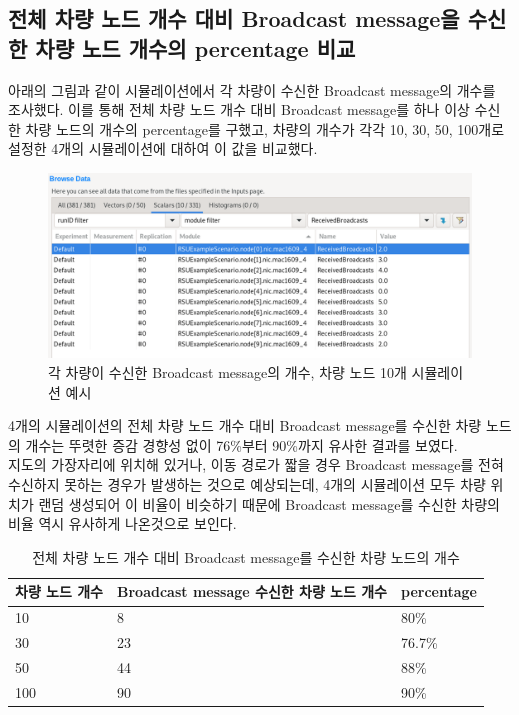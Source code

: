 \subsection*{전체 차량 노드 개수 대비 Broadcast message을 수신한 차량 노드 개수의 percentage 비교}
    아래의 그림과 같이 시뮬레이션에서 각 차량이 수신한 Broadcast message의 개수를 조사했다. 이를 통해 전체 차량 노드 개수 대비 Broadcast message를 하나 이상 수신한 차량 노드의 개수의 percentage를 구했고, 차량의 개수가 각각 10, 30, 50, 100개로 설정한 4개의 시뮬레이션에 대하여 이 값을 비교했다.
    \vspace{-3mm}
    \begin{figure}[!h]\centering 
        \includegraphics[width=.80\textwidth]{image/week14/2-5.png}
        \caption{\footnotesize
        각 차량이 수신한 Broadcast message의 개수, 차량 노드 10개 시뮬레이션 예시}
        \vspace{-10pt}
    \end{figure}

    4개의 시뮬레이션의 전체 차량 노드 개수 대비 Broadcast message를 수신한 차량 노드의 개수는 뚜렷한 증감 경향성 없이 76\%부터 90\%까지 유사한 결과를 보였다. \\
    지도의 가장자리에 위치해 있거나, 이동 경로가 짧을 경우 Broadcast message를 전혀 수신하지 못하는 경우가 발생하는 것으로 예상되는데, 4개의 시뮬레이션 모두 차량 위치가 랜덤 생성되어 이 비율이 비슷하기 때문에 Broadcast message를 수신한 차량의 비율 역시 유사하게 나온것으로 보인다.
    \vspace{-3mm}
    \begin{table}[h!]
    \centering
        \begin{tabular}{|l|l|l|}
        \hline
        \textbf{차량 노드 개수} & \textbf{Broadcast message 수신한 차량 노드 개수} & \textbf{percentage} \\
        \hline
        10 & 8 & 80\% \\
        \hline
        30 & 23 & 76.7\% \\
        \hline
        50 & 44 & 88\% \\
        \hline
        100 & 90 & 90\% \\
        \hline
        \end{tabular}
        \caption{전체 차량 노드 개수 대비 Broadcast message를 수신한 차량 노드의 개수}
    \end{table}
    \vspace{-3mm}

